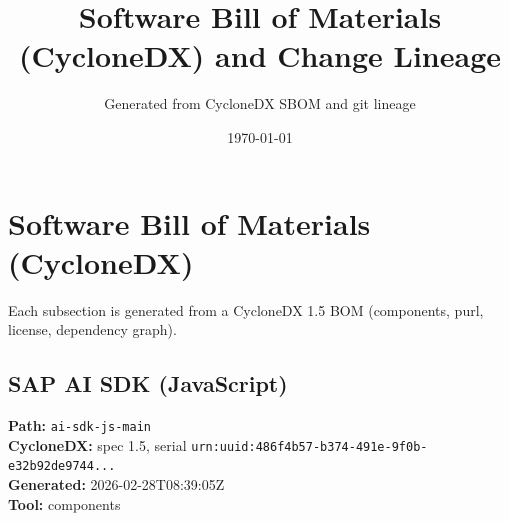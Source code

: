 \documentclass[11pt]{article}
\title{Software Bill of Materials (CycloneDX) and Change Lineage}
\author{Generated from CycloneDX SBOM and git lineage}
\date{\today}
\begin{document}
\maketitle
\tableofcontents
\newpage
\section{Software Bill of Materials (CycloneDX)}
Each subsection is generated from a CycloneDX 1.5 BOM (components, purl, license, dependency graph).

\subsection{SAP AI SDK (JavaScript)}
\textbf{Path:} \texttt{ai-sdk-js-main}
\\ \textbf{CycloneDX:} spec 1.5, serial \texttt{urn:uuid:486f4b57-b374-491e-9f0b-e32b92de9744...}
\\ \textbf{Generated:} 2026-02-28T08:39:05Z
\\ \textbf{Tool:} components
\end{document}
